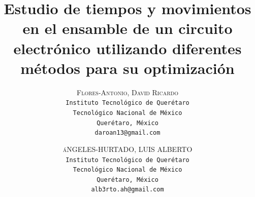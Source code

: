     \lfoot{ \thepage}
    
    \setlength{\droptitle}{-5\baselineskip} %
    \title{\textbf{Estudio de tiempos y movimientos en el ensamble de un circuito electrónico utilizando diferentes métodos para su optimización }} %
    
     \author{ 
     \textsc{Flores-Antonio, David Ricardo}\\ 
     \texttt{ Instituto Tecnológico de Querétaro } \\ 
     \texttt{Tecnológico Nacional de México} \\ 
     \texttt{Querétaro, México}\\ 
     \texttt{daroan13@gmail.com} 
     \and 
     \textsc{áNGELES-HURTADO, LUIS ALBERTO}\\ 
     \texttt{ Instituto Tecnológico de Querétaro } \\ 
     \texttt{ Tecnológico Nacional de México } \\ 
     \texttt{Querétaro, México}\\ 
     \texttt{alb3rto.ah@gmail.com} 
    }
    
    
    
    
